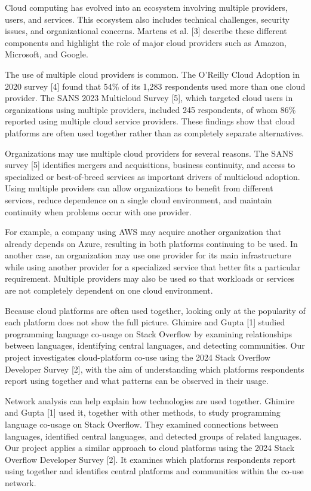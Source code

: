 \documentclass{article}
\begin{document}
{\color{mygreen} 

Cloud computing has evolved into an ecosystem involving multiple providers, users, and services. This ecosystem also includes technical challenges, security issues, and organizational concerns. Martens et al. [3] describe these different components and highlight the role of major cloud providers such as Amazon, Microsoft, and Google.

The use of multiple cloud providers is common. The O'Reilly Cloud Adoption in 2020 survey [4] found that 54\% of its 1,283 respondents used more than one cloud provider. The SANS 2023 Multicloud Survey [5], which targeted cloud users in organizations using multiple providers, included 245 respondents, of whom 86\% reported using multiple cloud service providers. These findings show that cloud platforms are often used together rather than as completely separate alternatives.

Organizations may use multiple cloud providers for several reasons. The SANS survey [5] identifies mergers and acquisitions, business continuity, and access to specialized or best-of-breed services as important drivers of multicloud adoption. Using multiple providers can allow organizations to benefit from different services, reduce dependence on a single cloud environment, and maintain continuity when problems occur with one provider.

For example, a company using AWS may acquire another organization that already depends on Azure, resulting in both platforms continuing to be used. In another case, an organization may use one provider for its main infrastructure while using another provider for a specialized service that better fits a particular requirement. Multiple providers may also be used so that workloads or services are not completely dependent on one cloud environment.

Because cloud platforms are often used together, looking only at the popularity of each platform does not show the full picture. Ghimire and Gupta [1] studied programming language co-usage on Stack Overflow by examining relationships between languages, identifying central languages, and detecting communities. Our project investigates cloud-platform co-use using the 2024 Stack Overflow Developer Survey [2], with the aim of understanding which platforms respondents report using together and what patterns can be observed in their usage.
}

{\color{blue} Network analysis can help explain how technologies are used together. Ghimire and Gupta [1] used it, together with other methods, to study programming language co-usage on Stack Overflow. They examined connections between languages, identified central languages, and detected groups of related languages. Our project applies a similar approach to cloud platforms using the 2024 Stack Overflow Developer Survey [2]. It examines which platforms respondents report using together and identifies central platforms and communities within the co-use network.}
\end{document}
